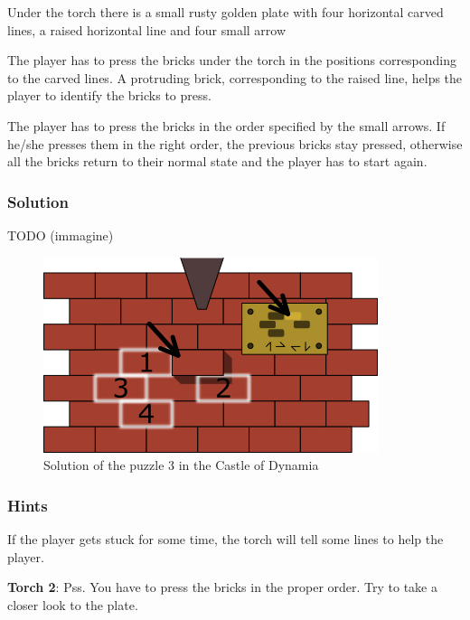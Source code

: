 

Under the torch there is a small rusty golden plate with four horizontal carved lines, a raised horizontal line and four small arrow

The player has to press the bricks under the torch in the positions corresponding to the carved lines. A protruding brick, corresponding to the raised line, helps the player to identify the bricks to press.

The player has to press the bricks in the order specified by the small arrows. If he/she presses them in the right order, the previous bricks stay pressed, otherwise all the bricks return to their normal state and the player has to start again.

\subsubsection*{Solution}
TODO (immagine)
\begin{figure}[H]
  \centering
  \includegraphics[width=\textwidth]{Images/Puzzles/castleOfDynamia3Solution}
  \caption{Solution of the puzzle 3 in the Castle of Dynamia}
\end{figure}

\subsubsection*{Hints}
If the player gets stuck for some time, the torch will tell some lines to help the player.

\textbf{Torch 2}: Pss. You have to press the bricks in the proper order. Try to take a closer look to the plate.


